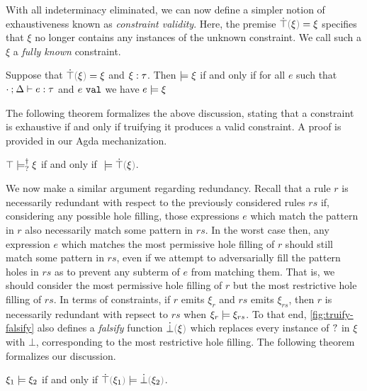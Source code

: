 

With all indeterminacy eliminated, we can now define a simpler notion of exhaustiveness known as \emph{constraint validity}. Here, the premise $\ctruify{\xi} = \xi$ specifies that $\xi$ no longer contains any instances of the unknown constraint. We call such a $\xi$ a \emph{fully known} constraint.

 \begin{definition}
 	\label{definition:valid-constraint}
 	Suppose that $\ctruify{\xi}=\xi$ and $\xi : \tau$.
 	Then $\models \xi$ if and only if for all $e$ such that $\cdot \mathbin{;} \Delta \vdash e : \tau$ and $e ~\mathtt{val}$ we have $e \models \xi$
 \end{definition}

The following theorem formalizes the above discussion, stating that a constraint is exhaustive if and only if truifying it produces a valid constraint. A proof is provided in our Agda mechanization.

\begin{theorem}
	\label{theorem:exhaustive-truify}
	$\top \models_{?}^{\dag} \xi$ if and only if $\ccsatisfy{\;}{\ctruify{\xi}}$.
\end{theorem}

We now make a similar argument regarding redundancy. Recall that a rule $r$ is necessarily redundant with respect to the previously considered rules $rs$ if, considering any possible hole filling, those expressions $e$ which match the pattern in $r$ also necessarily match some pattern in $rs$. In the worst case then, any expression $e$ which matches the most permissive hole filling of $r$ should still match some pattern in $rs$, even if we attempt to adversarially fill the pattern holes in $rs$ as to prevent any subterm of $e$ from matching them. That is, we should consider the most permissive hole filling of $r$ but the most restrictive hole filling of $rs$. In terms of constraints, if $r$ emits $\xi_r$ and $rs$ emits $\xi_{rs}$, then $r$ is necessarily redundant with repsect to $rs$ when $\xi_r \models \xi_{rs}$. To that end, \autoref{fig:truify-falsify} also defines a \emph{falsify} function $\cfalsify{\xi}$ which replaces every instance of $\mathtt{?}$ in $\xi$ with $\bot$, corresponding to the most restrictive hole filling. The following theorem formalizes our discussion.

\begin{theorem}
	\label{theorem:redundant-truify-falsify}
	$\xi_1 \models \xi_2$ if and only if $\ccsatisfy{\ctruify{\xi_1}}{\cfalsify{\xi_2}}$.
\end{theorem}

